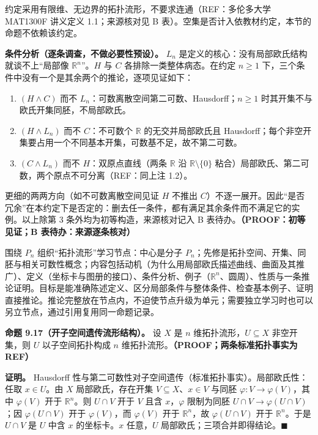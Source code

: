 \documentclass[UTF8,a4paper,zihao=-4,fontset=windows,openany]{ctexbook}
\newcommand{\mcsdisplay}[1]{%
  \par\addvspace{0.7em}%
  \sbox{\mcsmathbox}{\ensuremath{\displaystyle #1}}%
  \ifdim\wd\mcsmathbox>\linewidth
    \noindent\resizebox{\linewidth}{!}{\usebox{\mcsmathbox}}%
  \else
    \noindent\hspace*{\fill}\usebox{\mcsmathbox}\hspace*{\fill}%
  \fi
  \par\addvspace{0.7em}%
}
\def\ensuremath#1{#1}%
\def\text#1{#1}%
\begin{document}
\mcsdisplay{\forall x\in X\ \exists U\subseteq X\text{ 开}\quad
\exists V\subseteq\mathbb R^n\text{ 开}\quad
\exists\varphi:U\to V\text{ 同胚},\quad x\in U.}
\noindent 约定采用有限维、无边界的拓扑流形，不要求连通（REF：多伦多大学 MAT1300F 讲义定义 1.1；来源核对见 B 表）。空集是否计入依教材约定，本节的命题不依赖该约定。

\textbf{条件分析（逐条调查，不做必要性预设）。} \(L_n\) 是定义的核心：没有局部欧氏结构就谈不上“局部像 \(\mathbb R^n\)”。\(H\) 与 \(C\) 各排除一类整体病态。在约定 \(n\ge1\) 下，三个条件中没有一个是其余两个的推论，逐项见证如下：

\begin{enumerate}
\item \((H\land C)\) 而不 \(L_n\)：可数离散空间第二可数、Hausdorff；\(n\ge1\) 时其开集不与欧氏开集同胚，不局部欧氏。
\item \((H\land L_n)\) 而不 \(C\)：不可数个 \(\mathbb R\) 的无交并局部欧氏且 Hausdorff；每个非空开集要占用一个不同基本开集，可数基不足，故不第二可数。
\item \((C\land L_n)\) 而不 \(H\)：双原点直线（两条 \(\mathbb R\) 沿 \(\mathbb R\setminus\{0\}\) 粘合）局部欧氏、第二可数，两个原点不可分离（REF：同上注 1.2）。
\end{enumerate}
更细的两两方向（如不可数离散空间见证 \(H\) 不推出 \(C\)）不逐一展开。因此“是否冗余”在本约定下是否定的：删去任一条件，都有满足其余条件而不满足它的实例。以上除第 3 条外均为初等构造，来源核对记入 B 表待办。\textbf{（PROOF：初等见证；B 表待办：来源逐条核对）}

围绕 \(P_n\) 组织“拓扑流形”学习节点：中心是分子 \(P_n\)；先修是拓扑空间、开集、同胚与相关可数性概念；内容包括动机（为什么用局部欧氏描述曲线、曲面及其推广）、定义（坐标卡与图册的接口）、条件分析、例子（\(\mathbb R^n\)、圆周）、性质与一条推论证明。目标是能准确陈述定义、区分局部条件与整体条件、检查基本例子、证明直接推论。推论完整放在节点内，不迫使节点升级为单元；需要独立学习时也可以另立节点，通过引用复用同一命题记录。

\textbf{命题 9.17（开子空间遗传流形结构）。} 设 \(X\) 是 \(n\) 维拓扑流形，\(U\subseteq X\) 非空开集，则 \(U\) 以子空间拓扑构成 \(n\) 维拓扑流形。\textbf{（PROOF；两条标准拓扑事实为 REF）}

\textbf{证明。} Hausdorff 性与第二可数性对子空间遗传（标准拓扑事实）。局部欧氏性：任取 \(x\in U\)。由 \(X\) 局部欧氏，存在开集 \(V\subseteq X\)、\(x\in V\) 与同胚 \(\varphi:V\to\varphi(V)\)，其中 \(\varphi(V)\) 开于 \(\mathbb R^n\)。则 \(U\cap V\) 开于 \(V\) 且含 \(x\)，\(\varphi\) 限制为同胚 \(U\cap V\to\varphi(U\cap V)\)；因 \(\varphi(U\cap V)\) 开于 \(\varphi(V)\)，而 \(\varphi(V)\) 开于 \(\mathbb R^n\)，故 \(\varphi(U\cap V)\) 开于 \(\mathbb R^n\)。于是 \(U\cap V\) 是 \(U\) 中含 \(x\) 的坐标卡。\(x\) 任意，\(U\) 局部欧氏；三项合并即得结论。\(\blacksquare\)
\end{document}
